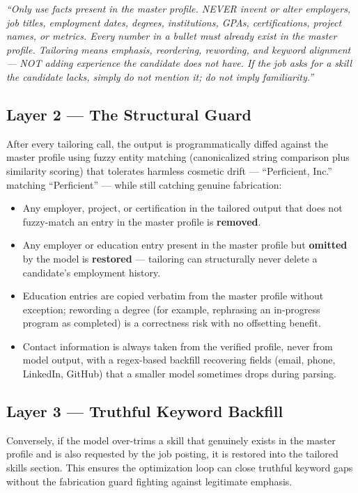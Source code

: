 \documentclass[10.5pt,letterpaper]{article}
\begin{document}
\begin{calloutbox}
\itshape\small
``Only use facts present in the master profile. NEVER invent or alter employers, job
titles, employment dates, degrees, institutions, GPAs, certifications, project names, or
metrics. Every number in a bullet must already exist in the master profile. Tailoring means
emphasis, reordering, rewording, and keyword alignment --- NOT adding experience the
candidate does not have. If the job asks for a skill the candidate lacks, simply do not
mention it; do not imply familiarity.''
\end{calloutbox}

\subsection{Layer 2 --- The Structural Guard}
After every tailoring call, the output is programmatically diffed against the master
profile using fuzzy entity matching (canonicalized string comparison plus similarity
scoring) that tolerates harmless cosmetic drift --- ``Perficient, Inc.'' matching
``Perficient'' --- while still catching genuine fabrication:
\begin{itemize}
  \item Any employer, project, or certification in the tailored output that does not
    fuzzy-match an entry in the master profile is \textbf{removed}.
  \item Any employer or education entry present in the master profile but
    \textbf{omitted} by the model is \textbf{restored} --- tailoring can structurally never
    delete a candidate's employment history.
  \item Education entries are copied verbatim from the master profile without exception;
    rewording a degree (for example, rephrasing an in-progress program as completed) is a
    correctness risk with no offsetting benefit.
  \item Contact information is always taken from the verified profile, never from model
    output, with a regex-based backfill recovering fields (email, phone, LinkedIn, GitHub)
    that a smaller model sometimes drops during parsing.
\end{itemize}

\subsection{Layer 3 --- Truthful Keyword Backfill}
Conversely, if the model over-trims a skill that genuinely exists in the master profile and
is also requested by the job posting, it is restored into the tailored skills section. This
ensures the optimization loop can close truthful keyword gaps without the fabrication guard
fighting against legitimate emphasis.
\end{document}
